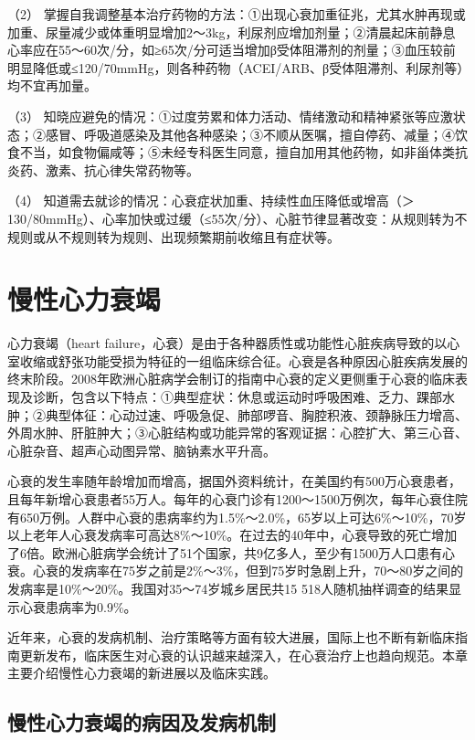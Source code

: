 （2）
掌握自我调整基本治疗药物的方法：①出现心衰加重征兆，尤其水肿再现或加重、尿量减少或体重明显增加2～3kg，利尿剂应增加剂量；②清晨起床前静息心率应在55～60次/分，如≥65次/分可适当增加β受体阻滞剂的剂量；③血压较前明显降低或≤120/70mmHg，则各种药物（ACEI/ARB、β受体阻滞剂、利尿剂等）均不宜再加量。

（3）
知晓应避免的情况：①过度劳累和体力活动、情绪激动和精神紧张等应激状态；②感冒、呼吸道感染及其他各种感染；③不顺从医嘱，擅自停药、减量；④饮食不当，如食物偏咸等；⑤未经专科医生同意，擅自加用其他药物，如非甾体类抗炎药、激素、抗心律失常药物等。

（4） 知道需去就诊的情况：心衰症状加重、持续性血压降低或增高（＞
130/80mmHg）、心率加快或过缓（≤55次/分）、心脏节律显著改变：从规则转为不规则或从不规则转为规则、出现频繁期前收缩且有症状等。

\protect\hypertarget{text00072.html}{}{}

\chapter{慢性心力衰竭}

心力衰竭（heart
failure，心衰）是由于各种器质性或功能性心脏疾病导致的以心室收缩或舒张功能受损为特征的一组临床综合征。心衰是各种原因心脏疾病发展的终末阶段。2008年欧洲心脏病学会制订的指南中心衰的定义更侧重于心衰的临床表现及诊断，包含以下特点：①典型症状：休息或运动时呼吸困难、乏力、踝部水肿；②典型体征：心动过速、呼吸急促、肺部啰音、胸腔积液、颈静脉压力增高、外周水肿、肝脏肿大；③心脏结构或功能异常的客观证据：心腔扩大、第三心音、心脏杂音、超声心动图异常、脑钠素水平升高。

心衰的发生率随年龄增加而增高，据国外资料统计，在美国约有500万心衰患者，且每年新增心衰患者55万人。每年的心衰门诊有1200～1500万例次，每年心衰住院有650万例。人群中心衰的患病率约为1.5\%～2.0\%，65岁以上可达6\%～10\%，70岁以上老年人心衰发病率可高达8\%～10\%。在过去的40年中，心衰导致的死亡增加了6倍。欧洲心脏病学会统计了51个国家，共9亿多人，至少有1500万人口患有心衰。心衰的发病率在75岁之前是2\%～3\%，但到75岁时急剧上升，70～80岁之间的发病率是10\%～20\%。我国对35～74岁城乡居民共15
518人随机抽样调查的结果显示心衰患病率为0.9\%。

近年来，心衰的发病机制、治疗策略等方面有较大进展，国际上也不断有新临床指南更新发布，临床医生对心衰的认识越来越深入，在心衰治疗上也趋向规范。本章主要介绍慢性心力衰竭的新进展以及临床实践。

\section{慢性心力衰竭的病因及发病机制}

